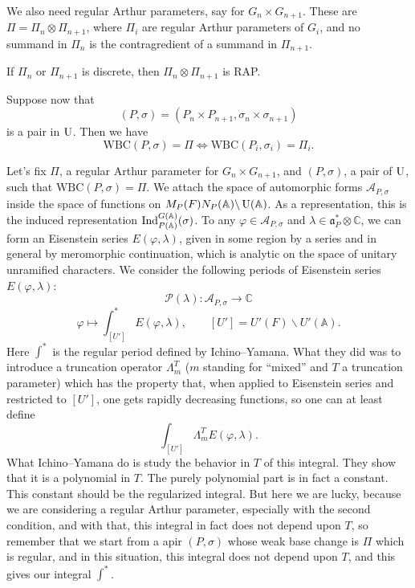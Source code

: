 \documentclass[reqno]{amsart} 
\begin{document}
We also need regular Arthur parameters, say for $G_n \times G_{n + 1}$.  These are $\Pi = \Pi_n \otimes \Pi_{n + 1}$, where $\Pi_i $ are regular Arthur parameters of $G_i $, and no summand in $\Pi_n $ is the contragredient of a summand in $\Pi_{n + 1}$.

\begin{example}
  If $\Pi_n $ or $\Pi_{n + 1}$ is discrete, then $\Pi_n \otimes \Pi_{n + 1}$ is RAP.
\end{example}
Suppose now that
\begin{equation*}
  (P, \sigma ) = (P_n \times P_{n + 1}, \sigma_n \times \sigma_{n + 1})
\end{equation*}
is a pair in $\operatorname{U}$.  Then we have
\begin{equation*}
\mathrm{WBC} (P, \sigma ) = \Pi \iff \mathrm{WBC} (P_i, \sigma_i ) = \Pi_i.
\end{equation*}

Let's fix $\Pi$, a regular Arthur parameter for $G_{n} \times G_{n + 1}$, and $(P, \sigma)$, a pair of $\operatorname{U}$, such that $\mathrm{WBC} (P, \sigma ) = \Pi$.  We attach the space of automorphic forms $\mathcal{A}_{P, \sigma }$ inside the space of functions on $M_P (F) N_P (\mathbb{A} ) \backslash \operatorname{U} (\mathbb{A})$.  As a representation, this is the induced representation $\operatorname{Ind}_{P (\mathbb{A} ) }^{G (\mathbb{A})} (\sigma)$.  To any $\varphi \in \mathcal{A}_{P, \sigma }$ and $\lambda \in \mathfrak{a}_P^\ast \otimes \mathbb{C}$, we can form an Eisenstein series $E (\varphi, \lambda )$, given in some region by a series and in general by meromorphic continuation, which is analytic on the space of unitary unramified characters.  We consider the following periods of Eisenstein series $E (\varphi, \lambda )$:
\begin{equation*}
\mathcal{P} (\lambda ) : \mathcal{A}_{P, \sigma } \rightarrow \mathbb{C} 
\end{equation*}
\begin{equation*}
\varphi \mapsto \int_{[U']}^\ast E (\varphi, \lambda ), \qquad [U'] = U ' (F) \backslash U' (\mathbb{A}).
\end{equation*}
Here $\int^\ast $ is the regular period defined by Ichino--Yamana.  What they did was to introduce a truncation operator $\Lambda^T_m $ ($m$ standing for ``mixed'' and $T$ a truncation parameter) which has the property that, when applied to Eisenstein series and restricted to $[U']$, one gets rapidly decreasing functions, so one can at least define
\begin{equation*}
\int_{[U']} \Lambda_m^T E (\varphi, \lambda ).
\end{equation*}
What Ichino--Yamana do is study the behavior in $T$ of this integral.  They show that it is a polynomial in $T$.  The purely polynomial part is in fact a constant.  This constant should be the regularized integral.  But here we are lucky, because we are considering a regular Arthur parameter, especially with the second condition, and with that, this integral in fact does not depend upon $T$, so remember that we start from a apir $(P, \sigma)$ whose weak base change is $\Pi$ which is regular, and in this situation, this integral does not depend upon $T$, and this gives our integral $\int^\ast $.
\end{document}
